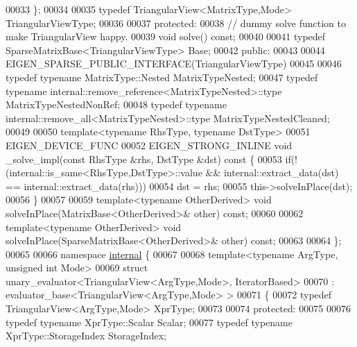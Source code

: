 \begin{DoxyCode}
00033     \};
00034     
00035     \textcolor{keyword}{typedef} TriangularView<MatrixType,Mode> TriangularViewType;
00036     
00037   \textcolor{keyword}{protected}:
00038     \textcolor{comment}{// dummy solve function to make TriangularView happy.}
00039     \textcolor{keywordtype}{void} solve() \textcolor{keyword}{const};
00040 
00041     \textcolor{keyword}{typedef} SparseMatrixBase<TriangularViewType> Base;
00042   \textcolor{keyword}{public}:
00043     
00044     EIGEN\_SPARSE\_PUBLIC\_INTERFACE(TriangularViewType)
00045     
00046     \textcolor{keyword}{typedef} \textcolor{keyword}{typename} MatrixType::Nested MatrixTypeNested;
00047     \textcolor{keyword}{typedef} \textcolor{keyword}{typename} internal::remove\_reference<MatrixTypeNested>::type MatrixTypeNestedNonRef;
00048     \textcolor{keyword}{typedef} \textcolor{keyword}{typename} internal::remove\_all<MatrixTypeNested>::type MatrixTypeNestedCleaned;
00049 
00050     \textcolor{keyword}{template}<\textcolor{keyword}{typename} RhsType, \textcolor{keyword}{typename} DstType>
00051     EIGEN\_DEVICE\_FUNC
00052     EIGEN\_STRONG\_INLINE \textcolor{keywordtype}{void} \_solve\_impl(\textcolor{keyword}{const} RhsType &rhs, DstType &dst)\textcolor{keyword}{ const }\{
00053       \textcolor{keywordflow}{if}(!(internal::is\_same<RhsType,DstType>::value && internal::extract\_data(dst) == 
      internal::extract\_data(rhs)))
00054         dst = rhs;
00055       this->solveInPlace(dst);
00056     \}
00057 
00059     \textcolor{keyword}{template}<\textcolor{keyword}{typename} OtherDerived> \textcolor{keywordtype}{void} solveInPlace(MatrixBase<OtherDerived>& other) \textcolor{keyword}{const};
00060 
00062     \textcolor{keyword}{template}<\textcolor{keyword}{typename} OtherDerived> \textcolor{keywordtype}{void} solveInPlace(SparseMatrixBase<OtherDerived>& other) \textcolor{keyword}{const};
00063   
00064 \};
00065 
00066 \textcolor{keyword}{namespace }\hyperlink{namespaceinternal}{internal} \{
00067 
00068 \textcolor{keyword}{template}<\textcolor{keyword}{typename} ArgType, \textcolor{keywordtype}{unsigned} \textcolor{keywordtype}{int} Mode>
00069 \textcolor{keyword}{struct }unary\_evaluator<TriangularView<ArgType,Mode>, IteratorBased>
00070  : evaluator\_base<TriangularView<ArgType,Mode> >
00071 \{
00072   \textcolor{keyword}{typedef} TriangularView<ArgType,Mode> XprType;
00073   
00074 \textcolor{keyword}{protected}:
00075   
00076   \textcolor{keyword}{typedef} \textcolor{keyword}{typename} XprType::Scalar Scalar;
00077   \textcolor{keyword}{typedef} \textcolor{keyword}{typename} XprType::StorageIndex StorageIndex;

\end{DoxyCode}
